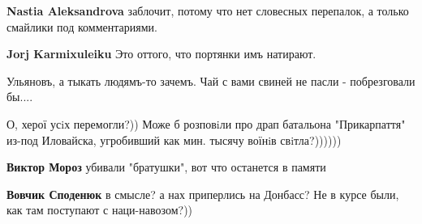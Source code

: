 \begin{itemize}
\begin{itemize}
\textbf{Nastia Aleksandrova} заблочит, потому что нет словесных перепалок, а только смайлики под комментариями.

 
\textbf{Jorj Karmixuleiku} Это оттого, что портянки имъ натирают.

 
Ульяновъ, а тыкать людямъ-то зачемъ. Чай с вами свиней не пасли - побрезговали бы....


\end{itemize}

 

О, херої усiх перемогли?)) Може б розповiли про драп батальона "Прикарпаття"
из-под Иловайска, угробивший как мин. тысячу воїнiв свiтла?))))))

\begin{itemize}
 
\textbf{Виктор Мороз} убивали "братушки", вот что останется в памяти

 
\textbf{Вовчик Споденюк} в смысле? а нах приперлись на Донбасс? Не в курсе были, как там поступают с наци-навозом?))

 

\end{itemize}
\end{itemize}
